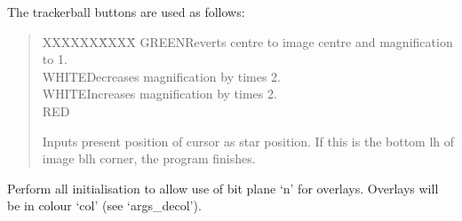 \begin{description}
The trackerball buttons are used as follows:
\begin{quote}
\begin{tabbing}
XXXXXX\=XXXX\=\kill
GREEN\>Reverts centre to image centre and magnification to 1.\\
WHITE\>Decreases magnification by times 2.\\
WHITE\>Increases magnification by times 2.\\
RED\>\begin{minipage}[t]{100mm}
Inputs present position of cursor as star position.
If this is the bottom lh of image blh corner, the program finishes.
\end{minipage}
\end{tabbing}
\end{quote}
Perform all initialisation to allow use of bit plane `n' for overlays.
Overlays will be in colour `col' (see `args\_decol').
\end{description}

